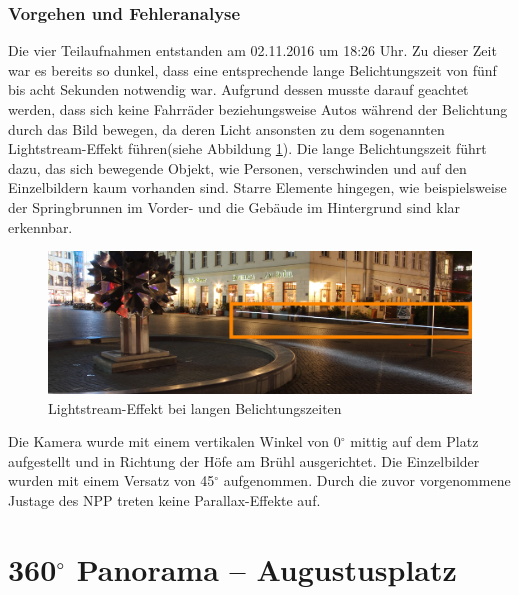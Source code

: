 \documentclass[liststotoc,bibtotoc,fontsize=14pt,]{scrreprt}
\begin{document}
			
	\subsubsection{Vorgehen und Fehleranalyse}
	Die vier Teilaufnahmen entstanden am 02.11.2016 um 18:26 Uhr. Zu dieser Zeit war es bereits so dunkel, dass eine entsprechende lange Belichtungszeit von fünf bis acht Sekunden notwendig war. Aufgrund dessen musste darauf geachtet werden, dass sich keine Fahrräder beziehungsweise Autos während der Belichtung durch das Bild bewegen, da deren Licht ansonsten zu dem sogenannten \grqq{}Lightstream-Effekt\grqq{} führen(siehe Abbildung \ref{img:ls}). Die lange Belichtungszeit führt dazu, das sich bewegende Objekt, wie Personen, verschwinden und auf den Einzelbildern kaum vorhanden sind. Starre Elemente hingegen, wie beispielsweise der Springbrunnen im Vorder- und die Gebäude im Hintergrund sind klar erkennbar. 
	
		\begin{figure}[H]
			\includegraphics[width=\linewidth]{img/lighstream.jpg}
			\caption{Lightstream-Effekt bei langen Belichtungszeiten}
			\label{img:ls}
		\end{figure}
	
	\bigskip
	Die Kamera wurde mit einem vertikalen Winkel von 0$^\circ$  mittig auf dem Platz aufgestellt und in Richtung der Höfe am Brühl ausgerichtet. Die Einzelbilder wurden mit einem Versatz von 45$^\circ$ aufgenommen. Durch die zuvor vorgenommene Justage des NPP treten keine Parallax-Effekte auf. 
	
	\section{360$^\circ$ Panorama -- Augustusplatz}
	\label{sec:augustus}
\end{document}
